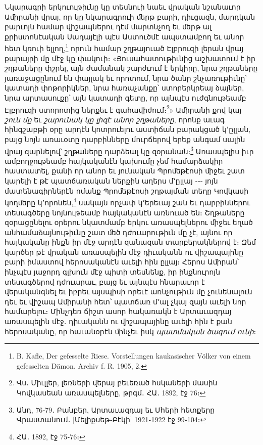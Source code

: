 \documentclass{article}
\begin{document}
{Նկարագրի երկուութիւնը կը տեսնուի նաեւ վրական նշանաւոր Աﬕրանի վրայ, որ կը նկարագրուի ﬔրթ բարի, դիւցազն, մարդկան բարւոյն համար վիշապներու դէմ մարտնչող եւ ﬔրթ ալ քրիստոնէական Սադայէլի պէս Աստուծմէ ապստամբող եւ անոր հետ կռուի ելլող,\footnote{B. Kafle, Der gefesselte Riese. Vorstellungen kaukasischer Völker von einem gefesselten Dämon. Archiv f. R. 1905, 2.} որուն համար շղթայուած Էլբրուզի լերան վրայ քարայրի մը մէջ կը փակուի։ «Յուսահատութիւնից աշխատում է իր շղթաները փշրել, այն ժամանակ շարժւում է երկիրը, նրա շղթաները յառաջացընում են փայլակ եւ որոտում, նրա ծանր շնչառութիւնը՝ կատաղի փոթորիկներ, նրա հառաչանքը՝ ստորերկրեայ ձայներ, նրա արտասուքը՝ այն կատաղի գետը, որ այնպէս ուժգնութեամբ Էլբրուզի ստորոտից ներքեւ է գահավիժում։\footnote{Վս․ Միւլլեր, լեռների վերայ բեւեռած հսկաների մասին Կովկասեան առասպելները, թրգմ․ ՀԱ․ 1892, էջ 76։}» Աﬕրանի քով կայ \emph{շուն մը} եւ \emph{շարունակ կը լիզէ անոր շղթաները}, որոնք աւագ հինգշաբթի օրը արդէն կոտրուելու աստիճան բարակցած կ՚ըլլան, բայց նոյն առաւօտը դարբինները մուրճերով երեք անգամ սալին վրայ զարնելով՝ շղթաները դարձեալ կը զօրանան։\footnote{Անդ, 76֊79․ Բանբեր, Արտաւազդայ եւ Մհերի հետքերը Վրաստանում․ [Մելիքսեթ֊Բէկի] 1921֊1922 էջ 99֊104։} Առասպելիս իւր ամբողջութեամբ հայկականէն կախումը չեմ համարձակիր հաստատել, քանի որ անոր եւ յունական Պրոﬔթէոսի ﬕջեւ շատ կարելի է թէ պատճառական ներքին աղերս մ՚ըլլայ ֊֊֊ յոյն մատենագիրներէն ոմանք Պրոﬔթէոսի շղթայման տեղը Կովկասի կողﬔրը կ՚որոնեն,\footnote{ՀԱ․ 1892, էջ 75֊76։} սակայն որչափ կ՚երեւայ շան եւ դարբիններու տեսագծերը նոյնութեամբ հայկականէն առնուած են։ Շղթաները զօրացընելու օրերու նկատմամբ երկու առասպելներու ﬕջեւ եղած անհամաձայնութիւնը շատ ﬔծ դժուարութիւն մը չէ, այնու որ հայկականը ինքն իր մէջ արդէն զանազան տարբերակներով է։ Զեմ կարծեր թէ վրական առասպելին մէջ դիւականն ու վիշապայինը բարի իմաստով հերոսականէն աւելի հին ըլլայ։ Հերոս Աﬕրան՝ ինչպէս յաջորդ գլխուն մէջ պիտի տեսնենք, իր ինքնուրոյն տեսագծերով դժուարաւ, բայց եւ այնպէս հնարաւոր է վերականգնել եւ իբրեւ այսպիսի որեւէ առնչութիւն մը չունենալուն դեւ եւ վիշապ Աﬕրանի հետ՝ պատճառ մ՚ալ չկայ զայն աւելի նոր համարելու։ Մինչդեռ ճիշտ ասոր հակառակն է Արտաւազդայ առասպելին մէջ․ դիւականն ու վիշապայինը աւելի հին է քան հերոսականը, որ հաւանօրէն ﬕնչեւ իսկ \emph{պատմական ծագում ունի}։

}
\end{document}
